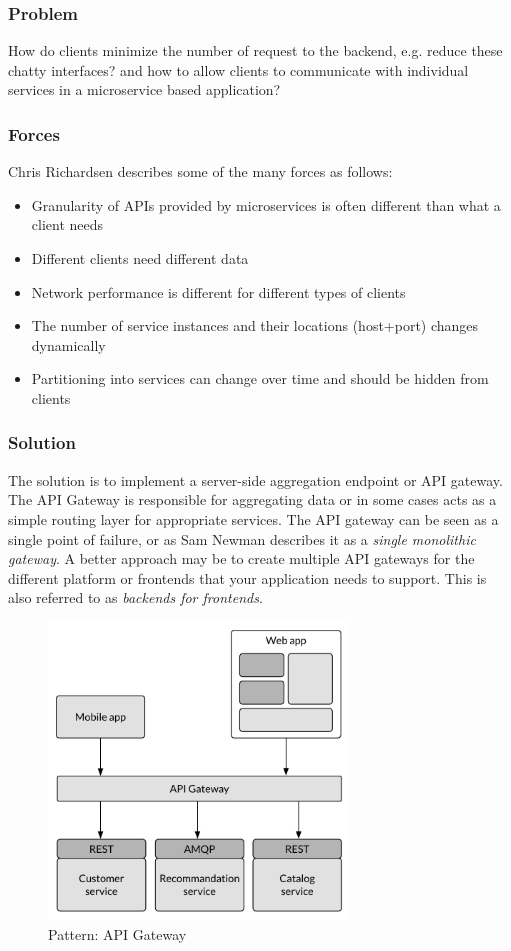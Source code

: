 \subsubsection*{Problem}  
How do clients minimize the number of request to the backend, e.g. reduce these chatty interfaces? and how to allow clients to communicate with individual services in a microservice based application?

\subsubsection*{Forces}  
Chris Richardsen describes some of the many forces as follows:
\begin{itemize}
    \setlength\itemsep{0.05em}
  \item Granularity of APIs provided by microservices is often different than what a client needs
  \item Different clients need different data
  \item Network performance is different for different types of clients
  \item The number of service instances and their locations (host+port) changes dynamically
  \item Partitioning into services can change over time and should be hidden from clients
\end{itemize}


\subsubsection*{Solution}
The solution is to implement a server-side aggregation endpoint or API gateway. The API Gateway is responsible for aggregating data or in some cases acts as a simple routing layer for appropriate services. The API gateway can be seen as a single point of failure, or as Sam Newman describes it as a \textit{single monolithic gateway}. A better approach may be to create multiple API gateways for the different platform or frontends that your application needs to support. This is also referred to as \textit{backends for frontends}.

\begin{figure}[H]
	\centering
	\includegraphics[width=8cm]{figures/api_gateway}
	\caption{Pattern: API Gateway}
	\label{fig:api_gateway}
\end{figure}


